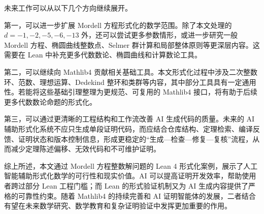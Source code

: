 未来工作可以从以下几个方向继续展开。

第一，可以进一步扩展 Mordell 方程形式化的数学范围。除了本文处理的 \(d=-1,-2,-5,-6,-13\) 外，还可以尝试更多参数情形，或进一步研究一般 Mordell 方程、椭圆曲线整数点、Selmer 群计算和局部整体原则等更深层内容。这需要在 Lean 中补充更多代数数论、椭圆曲线和计算数论工具。

第二，可以继续向 Mathlib4 贡献相关基础工具。本文形式化过程中涉及二次整数环、范数、理想运算、Dedekind 整环和类群等内容，其中部分工具具有一定通用性。若能将这些基础引理整理为更规范、可复用的 Mathlib4 接口，将有助于后续更多代数数论命题的形式化。

第三，可以通过更清晰的工程结构和工作流改善 AI 生成代码的质量。未来的 AI 辅助形式化系统不应只生成单段证明代码，而应结合仓库结构、定理检索、编译反馈、证明状态和版本控制信息，形成更稳定的“生成—检查—修复—复核”流程，从而减少定理陈述偏移、无效代码和不可维护证明。

综上所述，本文通过 Mordell 方程整数解问题的 Lean 4 形式化案例，展示了人工智能辅助形式化数学的可行性和现实价值。AI 可以提高证明开发效率，帮助使用者跨过部分 Lean 工程门槛；而 Lean 的形式验证机制又为 AI 生成内容提供了严格的可靠性约束。随着 Mathlib4 的持续完善和 AI 证明智能体的发展，二者结合有望在未来数学研究、数学教育和复杂证明验证中发挥更加重要的作用。
